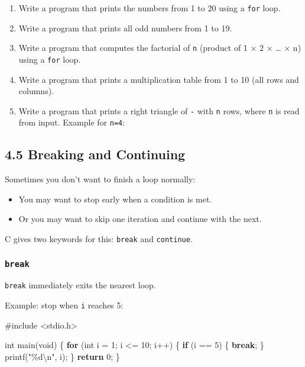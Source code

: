\documentclass[
  letterpaper,
  DIV=11,
  numbers=noendperiod]{scrreprt}
\newenvironment{Shaded}{\begin{snugshade}}{\end{snugshade}}
\newcommand{\ControlFlowTok}[1]{\textcolor[rgb]{0.00,0.23,0.31}{\textbf{#1}}}
\newcommand{\DataTypeTok}[1]{\textcolor[rgb]{0.68,0.00,0.00}{#1}}
\newcommand{\DecValTok}[1]{\textcolor[rgb]{0.68,0.00,0.00}{#1}}
\newcommand{\ImportTok}[1]{\textcolor[rgb]{0.00,0.46,0.62}{#1}}
\newcommand{\NormalTok}[1]{\textcolor[rgb]{0.00,0.23,0.31}{#1}}
\newcommand{\OperatorTok}[1]{\textcolor[rgb]{0.37,0.37,0.37}{#1}}
\newcommand{\PreprocessorTok}[1]{\textcolor[rgb]{0.68,0.00,0.00}{#1}}
\newcommand{\SpecialCharTok}[1]{\textcolor[rgb]{0.37,0.37,0.37}{#1}}
\newcommand{\StringTok}[1]{\textcolor[rgb]{0.13,0.47,0.30}{#1}}
\providecommand{\tightlist}{%
  \setlength{\itemsep}{0pt}\setlength{\parskip}{0pt}}
\begin{document}
\begin{enumerate}
\def\labelenumi{\arabic{enumi}.}
\tightlist
\item
  Write a program that prints the numbers from 1 to 20 using a
  \texttt{for} loop.
\item
  Write a program that prints all odd numbers from 1 to 19.
\item
  Write a program that computes the factorial of \texttt{n} (product of
  1 × 2 × \ldots{} × n) using a \texttt{for} loop.
\item
  Write a program that prints a multiplication table from 1 to 10 (all
  rows and columns).
\item
  Write a program that prints a right triangle of \texttt{-} with
  \texttt{n} rows, where \texttt{n} is read from input. Example for
  \texttt{n=4}:
\end{enumerate}

\subsection{4.5 Breaking and Continuing}\label{breaking-and-continuing}

Sometimes you don't want to finish a loop normally:

\begin{itemize}
\tightlist
\item
  You may want to stop early when a condition is met.
\item
  Or you may want to skip one iteration and continue with the next.
\end{itemize}

C gives two keywords for this: \texttt{break} and \texttt{continue}.

\subsubsection{\texorpdfstring{\texttt{break}}{break}}\label{break}

\texttt{break} immediately exits the nearest loop.

Example: stop when \texttt{i} reaches 5:

\begin{Shaded}
\begin{Highlighting}[]
\PreprocessorTok{\#include }\ImportTok{\textless{}stdio.h\textgreater{}}

\DataTypeTok{int}\NormalTok{ main}\OperatorTok{(}\DataTypeTok{void}\OperatorTok{)} \OperatorTok{\{}
    \ControlFlowTok{for} \OperatorTok{(}\DataTypeTok{int}\NormalTok{ i }\OperatorTok{=} \DecValTok{1}\OperatorTok{;}\NormalTok{ i }\OperatorTok{\textless{}=} \DecValTok{10}\OperatorTok{;}\NormalTok{ i}\OperatorTok{++)} \OperatorTok{\{}
        \ControlFlowTok{if} \OperatorTok{(}\NormalTok{i }\OperatorTok{==} \DecValTok{5}\OperatorTok{)} \OperatorTok{\{}
            \ControlFlowTok{break}\OperatorTok{;}
        \OperatorTok{\}}
\NormalTok{        printf}\OperatorTok{(}\StringTok{"}\SpecialCharTok{\%d\textbackslash{}n}\StringTok{"}\OperatorTok{,}\NormalTok{ i}\OperatorTok{);}
    \OperatorTok{\}}
    \ControlFlowTok{return} \DecValTok{0}\OperatorTok{;}
\OperatorTok{\}}
\end{Highlighting}
\end{Shaded}
\end{document}
